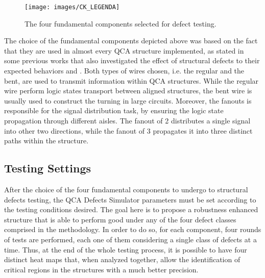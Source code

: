 \begin{figure}[!ht]
\center
{}
\hfill
{}
\linebreak
{}
\hfill
{}
\linebreak
{\texttt{[image: images/CK\_LEGENDA]}
}
\caption{The four fundamental components selected for defect testing.}
\label{figure:fundamental_components}
\end{figure}

The choice of the fundamental components depicted above was based on the fact that they are used in almost every QCA structure implemented, as stated in some previous works that also investigated the effect of structural defects to their expected behaviors \cite{yang12} and \cite{karim09}. Both types of wires chosen, i.e. the regular and the bent, are used to transmit information within QCA structures. While the regular wire perform logic states transport between aligned structures, the bent wire is usually used to construct the turning in large circuits. Moreover, the fanouts is responsible for the signal distribution task, by ensuring the logic state propagation through different aisles. The fanout of 2 distributes a single signal into other two directions, while the fanout of 3 propagates it into three distinct paths within the structure.

\subsection{Testing Settings}
\label{Testing_Settings}

After the choice of the four fundamental components to undergo to structural defects testing, the QCA Defects Simulator parameters must be set according to the testing conditions desired. The goal here is to propose a robustness enhanced structure that is able to perform good under any of the four defect classes comprised in the methodology. In order to do so, for each component, four rounds of tests are performed, each one of them considering a single class of defects at a time. Thus, at the end of the whole testing process, it is possible to have four distinct heat maps that, when analyzed together, allow the identification of critical regions in the structures with a much better precision.


